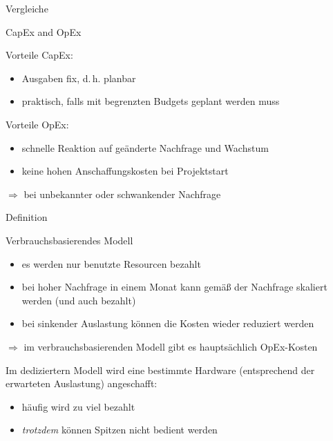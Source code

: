 \documentclass{scrartcl}
\newenvironment{flashcard}[2][]{%
    #1
    \vfill
    \centerline{\Large{#2}}
    \vfill
\newpage
}
{\newpage}
\begin{document}
    \begin{flashcard}[Vergleiche]{CapEx and OpEx}
        Vorteile CapEx:
        \begin{itemize}
            \item Ausgaben fix, d.\,h. planbar
            \item praktisch, falls mit begrenzten Budgets geplant werden muss
        \end{itemize}

        Vorteile OpEx:
        \begin{itemize}
            \item schnelle Reaktion auf geänderte Nachfrage und Wachstum
            \item keine hohen Anschaffungskosten bei Projektstart
        \end{itemize}
        $\Rightarrow$ bei unbekannter oder schwankender Nachfrage

    \end{flashcard}

    \begin{flashcard}[Definition]{Verbrauchsbasierendes Modell}
            \begin{itemize}
                \item es werden nur benutzte Resourcen bezahlt
                \item bei hoher Nachfrage in einem Monat kann gemäß der Nachfrage skaliert werden (und auch bezahlt)
                \item bei sinkender Auslastung können die Kosten wieder reduziert werden
            \end{itemize}
            $\Rightarrow$ im verbrauchsbasierenden Modell gibt es hauptsächlich OpEx-Kosten

            \vspace{5mm}
            Im dediziertern Modell wird eine bestimmte Hardware (entsprechend der erwarteten Auslastung) angeschafft:
            \begin{itemize}
                \item häufig wird zu viel bezahlt
                \item \emph{trotzdem} können Spitzen nicht bedient werden
            \end{itemize}
    \end{flashcard}
\end{document}
